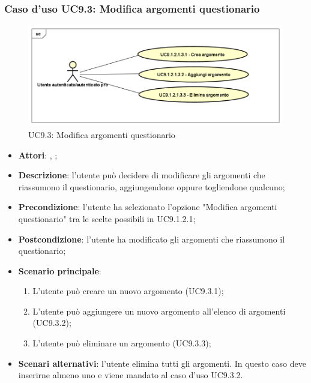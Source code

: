 	 \subsubsection{Caso d'uso UC9.3: Modifica argomenti questionario}
	 \label{UC9.3}
	 \begin{figure}[h]
	 	\centering
	 	\includegraphics[scale=0.5,keepaspectratio]{UML/UC9_1_2_1_3.png}
	 	\caption{UC9.3: Modifica argomenti questionario}
	 \end{figure}
	 \FloatBarrier
	 \begin{itemize}
	 	\item \textbf{Attori}: \uau, \uaupro;
	 	\item \textbf{Descrizione}: l'utente può decidere di modificare gli argomenti che riassumono il questionario, aggiungendone oppure togliendone qualcuno; 
	 	\item \textbf{Precondizione}: l'utente ha selezionato l'opzione "Modifica argomenti questionario" tra le scelte possibili in UC9.1.2.1; 
	 	\item \textbf{Postcondizione}: l'utente ha modificato gli argomenti che riassumono il questionario; 
	 	\item \textbf{Scenario principale}:
	 	\begin{enumerate}
	 		\item L'utente può creare un nuovo argomento (UC9.3.1);
	 		\item L'utente può aggiungere un nuovo argomento all'elenco di argomenti (UC9.3.2);
	 		\item L'utente può eliminare un argomento (UC9.3.3);
	 	\end{enumerate}
	 	\item \textbf{Scenari alternativi}: l'utente elimina tutti gli argomenti. In questo caso deve inserirne almeno uno e viene mandato al caso d'uso UC9.3.2.
	 \end{itemize}
	 
